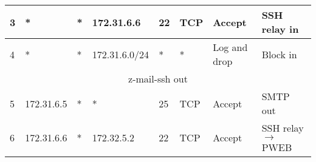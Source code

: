 \documentclass[a4paper, 11pt, oneside]{article}
\begin{document}
\begin{table}[H]
{\begin{tabular}{|llllllll|}
\multicolumn{1}{|l|}{3}           & \multicolumn{1}{l|}{*}                                                            & \multicolumn{1}{l|}{*}                                                              & \multicolumn{1}{l|}{172.31.6.6}                                                        & \multicolumn{1}{l|}{22}                                                                  & \multicolumn{1}{l|}{TCP}               & \multicolumn{1}{l|}{Accept}          & SSH relay in                           \\ \hline
\multicolumn{1}{|l|}{4}           & \multicolumn{1}{l|}{*}                                                            & \multicolumn{1}{l|}{*}                                                              & \multicolumn{1}{l|}{172.31.6.0/24}                                                     & \multicolumn{1}{l|}{*}                                                                   & \multicolumn{1}{l|}{*}                 & \multicolumn{1}{l|}{Log and drop}    & Block in                               \\ \hline
\multicolumn{8}{|c|}{{\color[HTML]{FE0000} z-mail-ssh out}}                                                                                                                                                                                                                                                                                                                                                                                                                                                              \\ \hline
\multicolumn{1}{|l|}{5}           & \multicolumn{1}{l|}{172.31.6.5}                                                   & \multicolumn{1}{l|}{*}                                                              & \multicolumn{1}{l|}{*}                                                                 & \multicolumn{1}{l|}{25}                                                                  & \multicolumn{1}{l|}{TCP}               & \multicolumn{1}{l|}{Accept}          & SMTP out                                \\ \hline
\multicolumn{1}{|l|}{6}           & \multicolumn{1}{l|}{172.31.6.6}                                                   & \multicolumn{1}{l|}{*}                                                              & \multicolumn{1}{l|}{172.32.5.2}                                                        & \multicolumn{1}{l|}{22}                                                                  & \multicolumn{1}{l|}{TCP}               & \multicolumn{1}{l|}{Accept}          & SSH relay $\rightarrow$ PWEB           \\ \hline

\end{tabular}}
\end{table}
\end{document}
